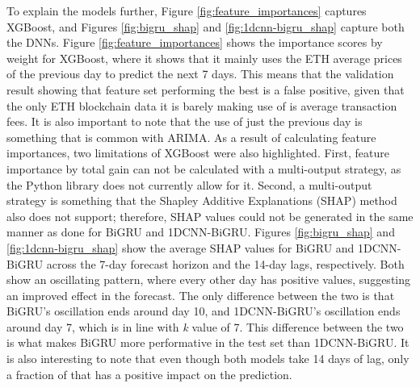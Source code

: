 \documentclass[ %
                    author={Raj Dhakan},
                supervisor={Dr. Ayush Joshi},
                    degree={MSc},
                     title={Ethereum Price Prediction using Internal and External Factors},
                  subtitle={},
                      type={},
                      year={2025}]{dissertation}
\begin{document}
To explain the models further, Figure \ref{fig:feature_importances} captures XGBoost, and Figures \ref{fig:bigru_shap} and \ref{fig:1dcnn-bigru_shap} capture both the DNNs. Figure \ref{fig:feature_importances} shows the importance scores by weight for XGBoost, where it shows that it mainly uses the ETH average prices of the previous day to predict the next 7 days. This means that the validation result showing that feature set  performing the best is a false positive, given that the only ETH blockchain data it is barely making use of is average transaction fees. It is also important to note that the use of just the previous day is something that is common with ARIMA. As a result of calculating feature importances, two limitations of XGBoost were also highlighted. First, feature importance by total gain can not be calculated with a multi-output strategy, as the Python library does not currently allow for it. Second, a multi-output strategy is something that the Shapley Additive Explanations (SHAP) method also does not support; therefore, SHAP values could not be generated in the same manner as done for BiGRU and 1DCNN-BiGRU. Figures \ref{fig:bigru_shap} and \ref{fig:1dcnn-bigru_shap} show the average SHAP values for BiGRU and 1DCNN-BiGRU across the 7-day forecast horizon and the 14-day lags, respectively. Both show an oscillating pattern, where every other day has positive values, suggesting an improved effect in the forecast. The only difference between the two is that BiGRU's oscillation ends around day 10, and 1DCNN-BiGRU's oscillation ends around day 7, which is in line with \textit{k} value of 7. This difference between the two is what makes BiGRU more performative in the test set than 1DCNN-BiGRU. It is also interesting to note that even though both models take 14 days of lag, only a fraction of that has a positive impact on the prediction.
\end{document}
